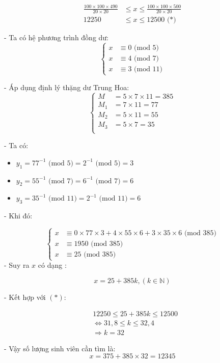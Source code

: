 \documentclass[12pt]{article}
\begin{document}
\begin{sloppypar}
\begin{align*}
    \frac{100\times 100\times 490}{20\times 20} & \leq x \leq \frac{100\times 100\times 500}{20\times 20} \\
    12250                     & \leq x \leq 12500 \text{ (*)}
\end{align*}

- Ta có hệ phương trình đồng dư:
\[
    \begin{cases}
        x & \equiv 0 \text{ (mod 5)} \\             
        x & \equiv 4 \text{ (mod 7)} \\
        x & \equiv 3 \text{ (mod 11)}
    \end{cases}
    \]

- Áp dụng định lý thặng dư Trung Hoa:
\[
    \begin{cases}
        M & = 5 \times 7 \times 11 = 385 \\             
        M_{1} & = 7 \times 11 = 77 \\
        M_{2} & = 5 \times 11 = 55 \\
        M_{3} & = 5 \times 7 = 35 \\
    \end{cases}
    \]

- Ta có:

\begin{itemize}
    \item \(y_{1} = 77^{-1} \text{ (mod 5)} = 2^{-1} \text{ (mod 5)} = 3\)
    \item \(y_{2} = 55^{-1} \text{ (mod 7)} = 6^{-1} \text{ (mod 7)} = 6\)
    \item \(y_{3} = 35^{-1} \text{ (mod 11)} = 2^{-1} \text{ (mod 11)} = 6\)
\end{itemize}

- Khi đó:

\[
    \begin{cases}
        x & \equiv 0\times 77\times 3 + 4\times 55\times 6 + 3\times 35\times 6 \text{ (mod 385)} \\             
        x & \equiv 1950 \text{ (mod 385)} \\
        x & \equiv 25 \text{ (mod 385)}
    \end{cases}
    \]
- Suy ra \(x\) có dạng :

\begin{equation*}
    x = 25 + 385k, (k \in \mathbb{N})
\end{equation*}

- Kết hợp với \((*)\): 

\begin{align*}
    & 12250                     \leq 25 + 385k \leq 12500 \\
    & \Leftrightarrow 31,8                       \leq k \leq 32,4 \\
    & \Rightarrow k  = 32
\end{align*}

- Vậy số lượng sinh viên cần tìm là:
\begin{equation*}
    x = 375 + 385 \times 32 = 12345
\end{equation*}

\end{sloppypar}
\end{document}
